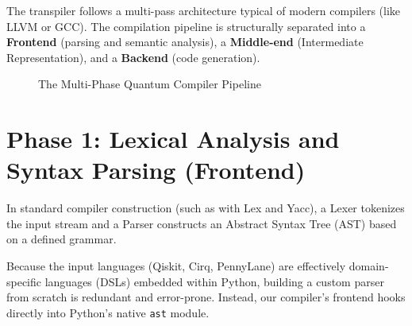 \documentclass[12pt, a4paper]{article}
\begin{document}
The transpiler follows a multi-pass architecture typical of modern compilers (like LLVM or GCC). The compilation pipeline is structurally separated into a \textbf{Frontend} (parsing and semantic analysis), a \textbf{Middle-end} (Intermediate Representation), and a \textbf{Backend} (code generation).

\begin{figure}[h]
\centering
{}
\caption{The Multi-Phase Quantum Compiler Pipeline}
\label{fig:pipeline}
\end{figure}

\section{Phase 1: Lexical Analysis and Syntax Parsing (Frontend)}
\label{sec:frontend}

In standard compiler construction (such as with Lex and Yacc), a Lexer tokenizes the input stream and a Parser constructs an Abstract Syntax Tree (AST) based on a defined grammar. 

Because the input languages (Qiskit, Cirq, PennyLane) are effectively domain-specific languages (DSLs) embedded within Python, building a custom parser from scratch is redundant and error-prone. Instead, our compiler's frontend hooks directly into Python's native \texttt{ast} module.
\end{document}
